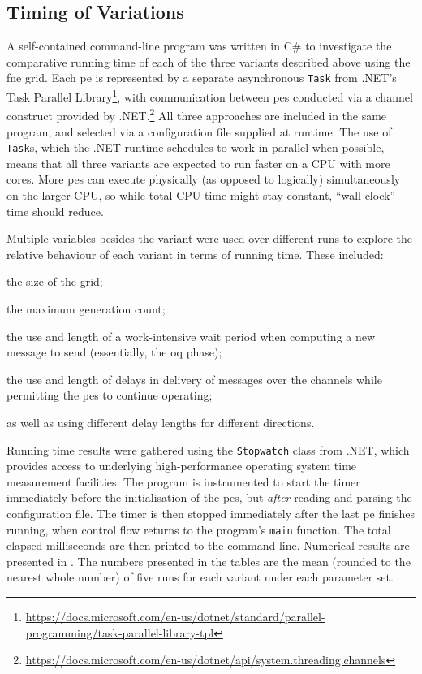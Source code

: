 \subsection{\label{sec:nmp:timingexp}Timing of Variations}
A self-contained command-line program was written in C\# to investigate the comparative running time of each of the three variants described above using the \gls{fne} grid.  Each \gls{pe} is represented by a separate asynchronous \texttt{Task} from .NET's Task Parallel Library{\footnote{\raggedright\url{https://docs.microsoft.com/en-us/dotnet/standard/parallel-programming/task-parallel-library-tpl}}}, with communication between \glspl{pe} conducted via a channel construct provided by .NET.\footnote{\url{https://docs.microsoft.com/en-us/dotnet/api/system.threading.channels}}  All three approaches are included in the same program, and selected via a configuration file supplied at runtime. The use of \texttt{Task}s, which the .NET runtime schedules to work in parallel when possible, means that all three variants are expected to run faster on a CPU with more cores.   More \glspl{pe} can execute physically (as opposed to logically) simultaneously on the larger CPU, so while total CPU time might stay constant, ``wall clock'' time should reduce.

Multiple variables besides the variant were used over different runs to explore the relative behaviour of each variant in terms of running time.  These included:
\begin{inparablank}
\item the size of the grid;
\item the maximum generation count;
\item the use and length of a work-intensive wait period when computing a new message to send (essentially, the \gls{oq} phase);
\item the use and length of delays in delivery of messages over the channels while permitting the \glspl{pe} to continue operating;
\item as well as using different delay lengths for different directions.
\end{inparablank}


Running time results were gathered using the \texttt{Stopwatch} class from .NET, which provides access to underlying high-performance operating system time measurement facilities.  The program is instrumented to start the timer immediately before the initialisation of the \glspl{pe}, but \emph{after} reading and parsing the configuration file.  The timer is then stopped immediately after the last \gls{pe} finishes running, when control flow returns to the program's \texttt{main} function.  The total elapsed milliseconds are then printed to the command line.  Numerical results are presented in .  The numbers presented in the tables are the mean (rounded to the nearest whole number) of five runs for each variant under each parameter set.

